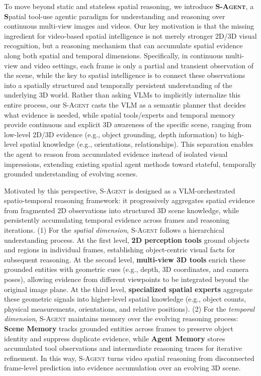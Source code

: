 To move beyond static and stateless spatial reasoning, we introduce \textbf{\textsc{S-Agent}}, a \textbf{S}patial tool-use agentic paradigm for understanding and reasoning over continuous multi-view images and videos. 
% 
Our key motivation is that the missing ingredient for video-based spatial intelligence is not merely stronger 2D/3D visual recognition, but a reasoning mechanism that can accumulate spatial evidence along both spatial and temporal dimensions. 
% 
Specifically, in continuous multi-view and video settings, each frame is only a partial and transient observation of the scene, while the key to spatial intelligence is to connect these observations into a spatially structured and temporally persistent understanding of the underlying 3D world.
% 
Rather than asking VLMs to implicitly internalize this entire process, our \textsc{S-Agent} casts the VLM as a semantic planner that decides what evidence is needed, while spatial tools/experts and temporal memory provide continuous and explicit 3D awareness of the specific scene, ranging from low-level 2D/3D evidence (e.g., object grounding, depth information) to high-level spatial knowledge (e.g., orientations, relationships).
% 
This separation enables the agent to reason from accumulated evidence instead of isolated visual impressions, extending existing spatial agent methods toward stateful, temporally grounded understanding of evolving scenes.
% 

Motivated by this perspective, \textsc{S-Agent} is designed as a VLM-orchestrated spatio-temporal reasoning framework: it progressively aggregates spatial evidence from fragmented 2D observations into structured 3D scene knowledge, while persistently accumulating temporal evidence across frames and reasoning iterations. 
% 
(1) For the \textit{spatial dimension}, \textsc{S-Agent} follows a hierarchical understanding process. 
At the first level, \textbf{2D perception tools} ground objects and regions in individual frames, establishing object-centric visual facts for subsequent reasoning. 
At the second level, \textbf{multi-view 3D tools} enrich these grounded entities with geometric cues (e.g., depth, 3D coordinates, and camera poses), allowing evidence from different viewpoints to be integrated beyond the original image plane. 
At the third level, \textbf{specialized spatial experts} aggregate these geometric signals into higher-level spatial knowledge (e.g., object counts, physical measurements, orientations, and relative positions). 
% 
(2) For the \textit{temporal dimension}, \textsc{S-Agent} maintains memory over the evolving reasoning process: \textbf{Scene Memory} tracks grounded entities across frames to preserve object identity and suppress duplicate evidence, while \textbf{Agent Memory} stores accumulated tool observations and intermediate reasoning traces for iterative refinement. 
In this way, \textsc{S-Agent} turns video spatial reasoning from disconnected frame-level prediction into evidence accumulation over an evolving 3D scene.


